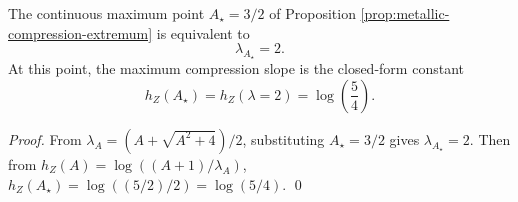 \begin{corollary}[``Syntax Entropy Locking'' at Maximum Projection Compression: \texorpdfstring{$\lambda=2$}{lambda=2}]\label{cor:metallic-compression-locking-lambda2}
The continuous maximum point \(A_\star=3/2\) of Proposition \ref{prop:metallic-compression-extremum} is equivalent to
\[
\lambda_{A_\star}=2.
\]
At this point, the maximum compression slope is the closed-form constant
\[
h_Z(A_\star)=h_Z(\lambda=2)=\log\!\left(\frac{5}{4}\right).
\]
\end{corollary}
\begin{proof}
From \(\lambda_A=(A+\sqrt{A^2+4})/2\), substituting \(A_\star=3/2\) gives \(\lambda_{A_\star}=2\).
Then from \(h_Z(A)=\log((A+1)/\lambda_A)\),
\(
h_Z(A_\star)=\log((5/2)/2)=\log(5/4)
\). \qed
\end{proof}

